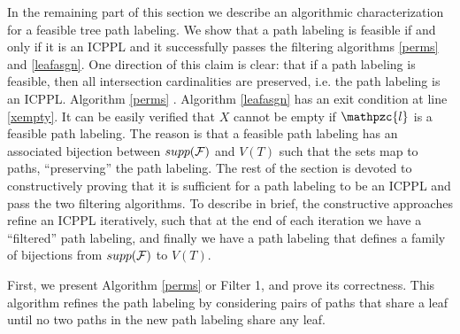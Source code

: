 \documentclass[11pt,letter]{../lib/llncs}
\def\cF{{\cal F}}
\def\cl{\mathpzc{l}}
\def\xnoindent{\noindent} %
\begin{document}
\xnoindent In the remaining part of this section we describe an
algorithmic characterization for a feasible tree path labeling. We
show that a path labeling is feasible if and only if it is an ICPPL
and it successfully passes the filtering algorithms \ref{perms} and
\ref{leafasgn}. One direction of this claim is clear: that if a path
labeling is feasible, then all intersection cardinalities are
preserved, i.e. the path labeling is an ICPPL. Algorithm \ref{perms}
. Algorithm \ref{leafasgn} has an exit condition at line
\ref{xempty}. It can be easily verified that $X$ cannot be empty if
$\cl$ is a feasible path labeling. The reason is that a feasible path
labeling has an associated bijection between $supp(\cF)$ and $V(T)$
\remove[a]{i.e. $supp(\cF^{\cl})$} such that the sets map to paths, ``preserving''
the path labeling. The rest of the section is devoted to
constructively proving that it is sufficient for a path labeling to be
an ICPPL and pass the two filtering algorithms.  To describe in brief,
the constructive approaches refine an ICPPL iteratively, such that at
the end of each iteration we have a ``filtered'' path labeling, and
finally we have a path labeling that defines a family of bijections
from $supp(\cF)$ to $V(T)$\remove[a]{ i.e. $supp(\cF^{\cl})$}.

\xnoindent First, we present Algorithm \ref{perms} or Filter 1, and
prove its correctness.  This algorithm refines the path labeling by
considering pairs of paths that share a leaf until no two paths in the
new path labeling share any leaf.
\end{document}
